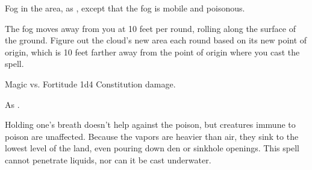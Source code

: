 \begin{spellheader}
\end{spellheader}
\begin{spellcontent}
    \begin{spelltargetinginfo}
    \end{spelltargetinginfo}
    \begin{spelleffects}
        \spelleffect Fog in the area, as , except that the fog is mobile and poisonous.

        \par The fog moves away from you at 10 feet per round, rolling along the surface of the ground. Figure out the cloud's new area each round based on its new point of origin, which is 10 feet farther away from the point of origin where you cast the spell.
        \spelldur{\durshort}
    \end{spelleffects}
\end{spellcontent}
\begin{spellcontent}
    \begin{spelltargetinginfo}
    \end{spelltargetinginfo}
    \begin{spelleffects}
        \begin{spellattack}{Magic vs. Fortitude}
            \spellsuccess 1d4 Constitution damage.
        \end{spellattack}
    \end{spelleffects}
\end{spellcontent}
\begin{spellfooter}
    \spellnotes As .

    Holding one's breath doesn't help against the poison, but creatures immune to poison are unaffected. Because the vapors are heavier than air, they sink to the lowest level of the land, even pouring down den or sinkhole openings. This spell cannot penetrate liquids, nor can it be cast underwater.
\end{spellfooter}

